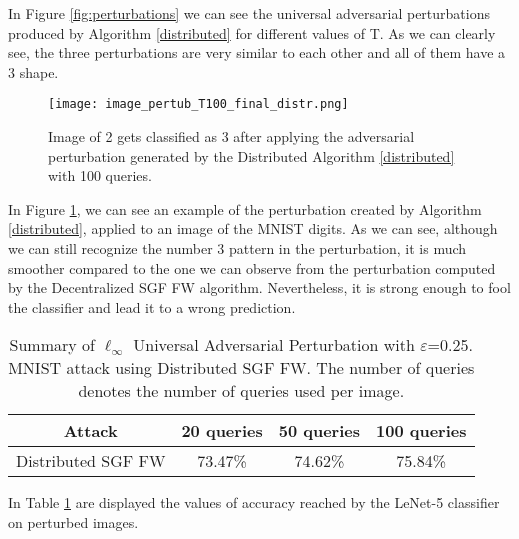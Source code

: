 In Figure \ref{fig:perturbations} we can see the universal adversarial perturbations produced by Algorithm \ref{distributed}
for different values of T. As we can clearly see, the three perturbations are very similar to each other and all of
them have a 3 shape.

\begin{figure}[htbp]
	\centering
	\texttt{[image: image\_pertub\_T100\_final\_distr.png]}
	\caption{Image of 2 gets classified as 3 after applying the adversarial perturbation generated by the Distributed
	Algorithm \ref{distributed} with 100 queries.}
	\label{fig:distributed}
\end{figure}

In Figure \ref{fig:distributed}, we can see an example of the perturbation created by Algorithm \ref{distributed},
applied to an image of the MNIST digits. As we can see, although we can still recognize the number 3 pattern in the
perturbation, it is much smoother compared to the one we can observe from the perturbation computed by the Decentralized
SGF FW algorithm. Nevertheless, it is strong enough to fool the classifier and lead it to a wrong prediction.

\begin{table}[htbp]
	\begin{center}
		\begin{adjustwidth}{-.6cm}{}
			\begin{tabular}{cccc}
				\textbf{Attack} &          20 \textbf{queries} &      50 \textbf{queries} &     100 \textbf{queries} \\
				\midrule
				{\small Distributed SGF FW}     &   73.47\% &    74.62\% &       75.84\% \\
			\end{tabular}
		\end{adjustwidth}
	\end{center}
	\caption{{\small Summary of $\ell_\infty$ Universal Adversarial Perturbation with $\varepsilon$=0.25. MNIST attack using Distributed
	SGF FW. The number of queries denotes the number of queries used per image.}}
	\label{tab:distributed}
\end{table}

In Table \ref{tab:distributed} are displayed the values of accuracy reached by the LeNet-5 classifier on perturbed images.